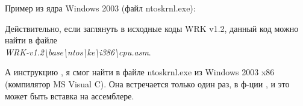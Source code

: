 \par
Пример из ядра Windows 2003 (файл ntoskrnl.exe):



Действительно, если заглянуть в исходные коды 
\ac{WRK} v1.2, данный код можно найти в файле \\
\emph{WRK-v1.2\textbackslash{}base\textbackslash{}ntos\textbackslash{}ke\textbackslash{}i386\textbackslash{}cpu.asm}.

\par 
А инструкцию , я смог найти в файле ntoskrnl.exe из Windows 2003 x86 (компилятор MS Visual C).
Она встречается только один раз, в ф-ции , и это может быть вставка на ассемблере.
